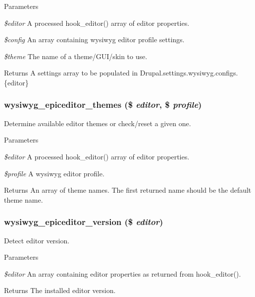 \begin{DoxyParams}{Parameters}
\item[{\em \$editor}]A processed hook\_\-editor() array of editor properties. \item[{\em \$config}]An array containing wysiwyg editor profile settings. \item[{\em \$theme}]The name of a theme/GUI/skin to use.\end{DoxyParams}
\begin{DoxyReturn}{Returns}
A settings array to be populated in Drupal.settings.wysiwyg.configs.\{editor\} 
\end{DoxyReturn}
\hypertarget{epiceditor_8inc_a25cfcf42e9d364fc39cdd8f2b4d76c5a}{
\subsubsection[{wysiwyg\_\-epiceditor\_\-themes}]{\setlength{\rightskip}{0pt plus 5cm}wysiwyg\_\-epiceditor\_\-themes (\$ {\em editor}, \/  \$ {\em profile})}}
\label{epiceditor_8inc_a25cfcf42e9d364fc39cdd8f2b4d76c5a}
Determine available editor themes or check/reset a given one.


\begin{DoxyParams}{Parameters}
\item[{\em \$editor}]A processed hook\_\-editor() array of editor properties. \item[{\em \$profile}]A wysiwyg editor profile.\end{DoxyParams}
\begin{DoxyReturn}{Returns}
An array of theme names. The first returned name should be the default theme name. 
\end{DoxyReturn}
\hypertarget{epiceditor_8inc_aba383a94bfa3f654a72ce95b108c6886}{
\subsubsection[{wysiwyg\_\-epiceditor\_\-version}]{\setlength{\rightskip}{0pt plus 5cm}wysiwyg\_\-epiceditor\_\-version (\$ {\em editor})}}
\label{epiceditor_8inc_aba383a94bfa3f654a72ce95b108c6886}
Detect editor version.


\begin{DoxyParams}{Parameters}
\item[{\em \$editor}]An array containing editor properties as returned from hook\_\-editor().\end{DoxyParams}
\begin{DoxyReturn}{Returns}
The installed editor version. 
\end{DoxyReturn}
